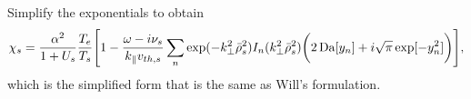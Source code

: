 Simplify the exponentials to obtain
\begin{equation}
	\chi_s = \frac{\alpha^2}{1+U_s} \frac{T_e}{T_s}  
	\Bigg[ 1
	- \frac{\omega-i\nu_s}{k_\parallel v_{th,s}}
	\sum_n
	\exp(-k_\perp^2 \bar{\rho}_s^2) 
	I_n(k_\perp^2 \bar{\rho}_s^2)
	\bigg( 2 \operatorname{Da} [y_n]   +i\sqrt{\pi} \exp[-y_n^2]\bigg)
	\Bigg],
\end{equation}
which is the simplified form that is the same as Will's formulation.
%
%
